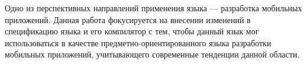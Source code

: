 Одно из перспективных направлений применения языка  ---
разработка мобильных приложений. Данная работа фокусируется на внесении
изменений в спецификацию языка  и его компилятор с тем, чтобы
данный язык мог использоваться в качестве предметно-ориентированного языка
разработки мобильных приложений, учитывающего современные тенденции данной 
области.